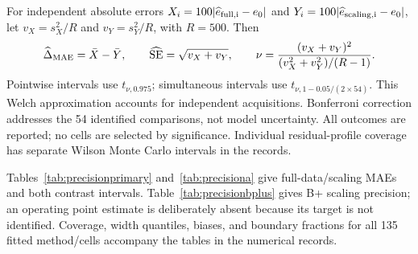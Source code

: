 For independent absolute errors $X_i=100|\widehat e_{\rm full,i}-e_0|$ and
$Y_i=100|\widehat e_{\rm scaling,i}-e_0|$, let
$v_X=s_X^2/R$ and $v_Y=s_Y^2/R$, with $R=500$. Then
\begin{equation}
 \widehat\Delta_{\rm MAE}=\bar X-\bar Y,\qquad
 \widehat{\mathrm{SE}}=\sqrt{v_X+v_Y},\qquad
 \nu=\frac{(v_X+v_Y)^2}{(v_X^2+v_Y^2)/(R-1)}.
\end{equation}
Pointwise intervals use $t_{\nu,0.975}$; simultaneous intervals use
$t_{\nu,1-0.05/(2\times54)}$. This Welch approximation accounts for independent
acquisitions. Bonferroni correction addresses the 54 identified comparisons,
not model uncertainty. All outcomes are reported; no cells are selected by
significance. Individual residual-profile coverage has separate Wilson Monte
Carlo intervals in the records.

Tables~\ref{tab:precisionprimary} and~\ref{tab:precisiona} give full-data/scaling
MAEs and both contrast intervals. Table~\ref{tab:precisionbplus} gives B+ scaling
precision; an operating point estimate is deliberately absent because its target
is not identified. Coverage, width quantiles, biases, and boundary fractions for
all 135 fitted method/cells accompany the tables in the numerical records.

